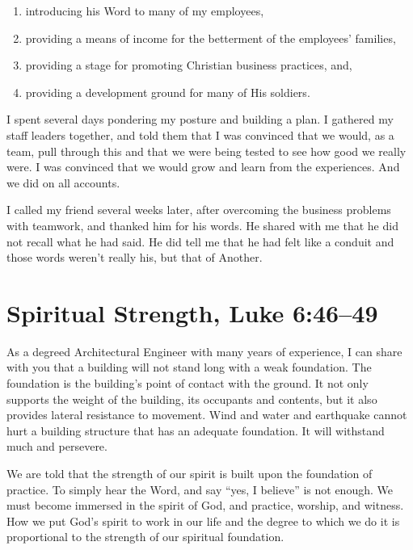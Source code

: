 \documentclass[12pt]{memoir}
\begin{document}
\begin{enumerate}
\item introducing his Word to many of my employees,

\item providing a means of income for the betterment of the employees' families,

\item providing a stage for promoting Christian business practices, and,

\item providing a development ground for many of His soldiers. 
\end{enumerate}


I spent several days pondering my posture and building a plan. I
gathered my staff leaders together, and told them that I was convinced
that we would, as a team, pull through this and that we were being
tested to see how good we really were. I was convinced that we would grow and learn from the experiences. And we did on all accounts.

I called my friend several weeks later, after overcoming the business
problems with teamwork, and thanked him for his words. He shared with
me that he did not recall what he had said. He did tell me that he
had felt like a conduit and those words weren't really his, but that
of Another.

\section[Spiritual Strength]{Spiritual Strength, Luke 6:46--49}

As a degreed Architectural Engineer with many years of experience,
I can share with you that a building will not stand long with a weak
foundation. The foundation is the building's point of contact with
the ground. It not only supports the weight of the building, its occupants
and contents, but it also provides lateral resistance to movement.
Wind and water and earthquake cannot hurt a building structure that has an adequate foundation. It will withstand much and persevere.

We are told that the strength of our spirit is built upon the foundation
of practice. To simply hear the Word, and say ``yes, I believe'' is not enough. We must become immersed in the spirit of God, and practice,
worship, and witness. How we put God's spirit to work in our life
and the degree to which we do it is proportional to the strength
of our spiritual foundation.
\end{document}
